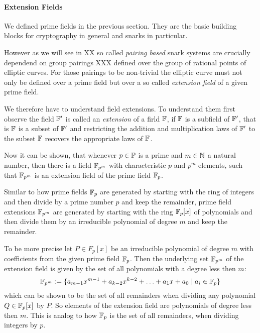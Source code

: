 \paragraph{Extension Fields}
We defined prime fields in the previous section. They are the basic building blocks for cryptography in general and snarks in particular. 

However as we will see in XX so called \textit{pairing based} snark systems are crucially dependend on group pairings XXX defined over the group of rational points of elliptic curves. For those pairings to be non-trivial the elliptic curve must not only be defined over a prime field but over a so called \textit{extension field} of a given prime field.

We therefore have to understand field extensions. To understand them first observe the field $\mathbb{F}'$ is called an \textit{extension} of a firld $\mathbb{F}$, if $\mathbb{F}$ is a subfield of $\mathbb{F}'$, that is $\mathbb{F}$ is a subset of $\mathbb{F}'$ and restricting the addition and multiplication laws of $\mathbb{F}'$ to the subset $\mathbb{F}$ recovers the appropriate laws of $\mathbb{F}$.

Now it can be shown, that whenever $p\in \mathbb{P}$ is a prime and $m\in\mathbb{N}$ a natural number, then there is a field $\mathbb{F}_{p^m}$ with characteristic $p$ and $p^m$ elements, such that $\mathbb{F}_{p^m}$ is an extension field of the prime field $\mathbb{F}_p$. 

Similar to how prime fields $\mathbb{F}_p$ are generated by starting with the ring of integers and then divide by a prime number $p$ and keep the remainder, prime field extensions $\mathbb{F}_{p^m}$ are generated by starting with the ring $\mathbb{F}_p[x]$ of polynomials and then divide them by an irreducible polynomial of degree $m$ and keep the remainder. 

To be more precise let $P\in F_p[x]$ be an irreducible polynomial of degree $m$ with coefficients from the given prime field $\mathbb{F}_p$. Then the underlying set $\mathbb{F}_{p^m}$ of the extension field is given by the set of all polynomials with a degree less then $m$:
\begin{equation}
\mathbb{F}_{p^m}:=\{a_{m-1} x^{m-1}+a_{k-2}x^{k-2}+\ldots+a_1 x+a_0\;|\; a_i\in \mathbb{F}_p\}
\end{equation}
which can be shown to be the set of all remainders when dividing any polynomial $Q\in \mathbb{F}_p[x]$ by $P$. So elements of the extension field are polynomials of degree less then $m$. This is analog to how $\mathbb{F}_p$ is the set of all remainders, when dividing integers by $p$.   

